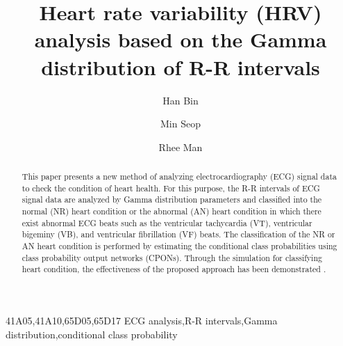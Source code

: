 \documentclass[times,twocolumn,final,authoryear]{elsarticle}
\begin{document}
\begin{frontmatter}

\title{Heart rate variability (HRV) analysis based on the Gamma distribution of R-R intervals}

\author[1]{Han Bin } 
\author[2]{Min Seop } 
\author[3]{Rhee Man }

\address[1]{Department of Electrical and Computer Engineering, Sungkyukwan University, 2066 Seobu-ro, Jangan-gu, Suwon 16419, Korea}
\address[2]{School of Electronic and Electrical Engineering, Sungkyukwan University, 2066 Seobu-ro, Jangan-gu, Suwon 16419, Korea}
\address[3]{Department of Electrical and Computer Engineering, Sungkyukwan University, 2066 Seobu-ro, Jangan-gu, Suwon 16419, Korea}



\begin{abstract}
This paper presents a new method of analyzing 
electrocardiography (ECG) signal data to check the condition of heart health. For this purpose, the R-R intervals of ECG signal data are analyzed by Gamma distribution parameters and classified into the normal (NR) heart condition or the abnormal (AN) heart condition in which there exist
abnormal ECG beats such as the ventricular tachycardia (VT), ventricular bigeminy (VB), and ventricular fibrillation (VF) beats.
The classification of the NR or AN heart condition is performed by estimating
the conditional class probabilities using class probability output networks (CPONs). 
Through the simulation for classifying heart condition, the effectiveness of the proposed approach has been demonstrated .
\end{abstract}

\begin{keyword}
\MSC 41A05\sep 41A10\sep 65D05\sep 65D17
\KWD ECG analysis\sep R-R intervals\sep Gamma distribution\sep conditional class probability

\end{keyword}

\end{frontmatter}

\end{document}
